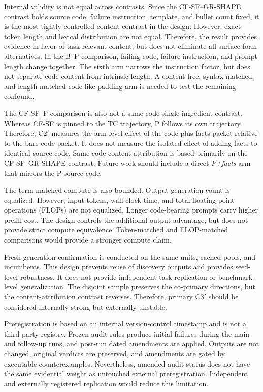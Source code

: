 \documentclass{article}
\numberwithin{equation}{section}  %
\theoremstyle{definition}
\newcommand{\armP}{\textsf{P}}
\newcommand{\armB}{\textsf{B}}
\newcommand{\armTC}{\textsf{TC}}
\newcommand{\armCF}{\textsf{CF-SF}}
\newcommand{\armGR}{\textsf{GR-SHAPE}}
\newcommand{\Ctwo}{C2$'$}
\newcommand{\Cthree}{C3$'$}
\begin{document}
Internal validity is not equal across contrasts. Since the \armCF{}--\armGR{} contrast holds
source code, failure instruction, template, and bullet count fixed, it is the most tightly
controlled content contrast in the design. However, exact token length and lexical
distribution are not equal. Therefore, the result provides evidence in favor of
task-relevant content, but does not eliminate all surface-form alternatives. In the
\armB{}--\armP{} comparison, failing code, failure instruction, and prompt length change
together. The sixth arm narrows the instruction factor, but does not separate code content
from intrinsic length. A content-free, syntax-matched, and length-matched code-like padding
arm is needed to test the remaining confound.

The \armCF{}--\armP{} comparison is also not a same-code single-ingredient contrast. Whereas
\armCF{} is pinned to the \armTC{} trajectory, \armP{} follows its own trajectory. Therefore,
\Ctwo{} measures the arm-level effect of the code-plus-facts packet relative to the bare-code
packet. It does not measure the isolated effect of adding facts to identical source code.
Same-code content attribution is based primarily on the \armCF{}--\armGR{} contrast. Future
work should include a direct \emph{P+facts} arm that mirrors the \armP{} source code.

The term matched compute is also bounded. Output generation count is equalized. However,
input tokens, wall-clock time, and total floating-point operations (FLOPs) are not equalized.
Longer code-bearing prompts carry higher prefill cost. The design controls the
additional-output advantage, but does not provide strict compute equivalence. Token-matched
and FLOP-matched comparisons would provide a stronger compute claim.

Fresh-generation confirmation is conducted on the same units, cached pools, and incumbents.
This design prevents reuse of discovery outputs and provides seed-level robustness. It does
not provide independent-task replication or benchmark-level generalization. The disjoint
sample preserves the co-primary directions, but the content-attribution contrast reverses.
Therefore, primary \Cthree{} should be considered internally strong but externally unstable.

Preregistration is based on an internal version-control timestamp and is not a third-party
registry. Frozen audit rules produce initial failures during the main and follow-up runs, and
post-run dated amendments are applied. Outputs are not changed, original verdicts are
preserved, and amendments are gated by executable counterexamples. Nevertheless, amended
audit status does not have the same evidential weight as untouched external preregistration.
Independent and externally registered replication would reduce this limitation.
\end{document}
